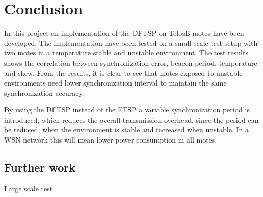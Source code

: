 \documentclass[Main]{subfiles}
\begin{document}
\section{Conclusion} %
\label{sec:conclusion}
	In this project an implementation of the DFTSP on TelosB motes have been developed. 
	The implementation have been tested on a small scale test setup with two motes in a temperature stable and unstable environment. 
	The test results shows the correlation between synchronization error, beacon period, temperature and skew.
	From the results, it is clear to see that motes exposed to unstable environments need lower synchronization interval to maintain the same synchronization accuracy.

	By using the DFTSP instead of the FTSP a variable synchronization period is introduced, which reduces the overall transmission overhead, since the period can be reduced, when the environment is stable and increased when unstable.
	In a WSN network this will mean lower power consumption in all motes.

	\subsection{Further work} %
	\label{sub:further_work}
		Large scale test

		

\end{document}
